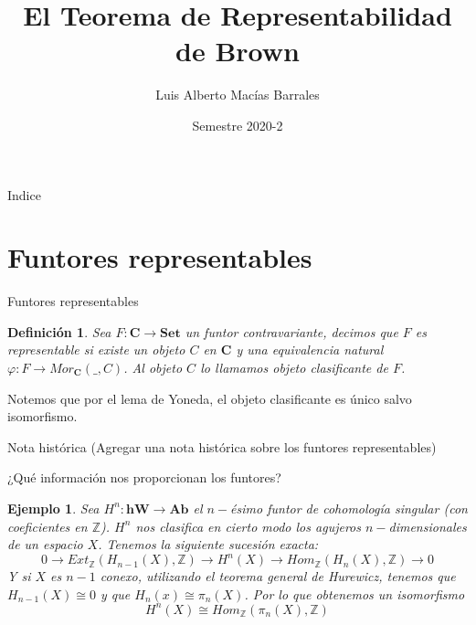 \documentclass{beamer}
\title{El Teorema de Representabilidad de Brown}
\author{Luis Alberto Macías Barrales}
\institute{Instituto de Matemáticas, UNAM}
\date{Semestre 2020-2}
\newtheorem{df}{Definici\'on}
\newtheorem{ejem}{Ejemplo}
\newcommand{\Z}{\mathbb{Z}}
\begin{document}
\begin{frame}
\titlepage
\end{frame}

\begin{frame}{Indice}
\tableofcontents
\end{frame}


\section{Funtores representables}

\begin{frame}{Funtores representables}
	\begin{df}
	Sea $F\colon \mathbf{C}\to\mathbf{Set}$ un funtor contravariante, decimos que $F$ es representable si existe un objeto $C$ en $\mathbf{C}$ y una equivalencia natural $\varphi\colon F\to Mor_\mathbf{C} (\_ ,C)$. Al objeto $C$ lo llamamos objeto clasificante de $F$.
	\end{df}
	
	Notemos que por el lema de Yoneda, el objeto clasificante es único salvo isomorfismo.
\end{frame}

\begin{frame}{Nota histórica}
	(Agregar una nota histórica sobre los funtores representables)
\end{frame}

\begin{frame}{¿Qué información nos proporcionan los funtores?}
	
	\begin{ejem}
		 Sea $H^n \colon \mathbf{hW}\to \mathbf{Ab}$ el $n-$ésimo funtor de cohomología singular (con coeficientes en $\Z$). $H^n$ nos clasifica en cierto modo los \emph{agujeros} $n-$dimensionales de un espacio $X$. Tenemos la siguiente sucesión exacta:
			\[0 \to Ext_\Z (H_{n-1}(X),\Z)\to H^n(X) \to Hom_\Z (H_n (X),\Z)\to0\]
			Y si $X$ es $n-1$ conexo, utilizando el teorema general de Hurewicz, tenemos que $H_{n-1}(X)\cong 0$ y que $H_n (x)\cong \pi_n (X)$. Por lo que obtenemos un isomorfismo 
	\[H^n(X)\cong Hom_\Z(\pi_n(X),\Z)\]
	\end{ejem}
\end{frame}

\begin{frame}
	
		
\end{frame}
\end{document}
